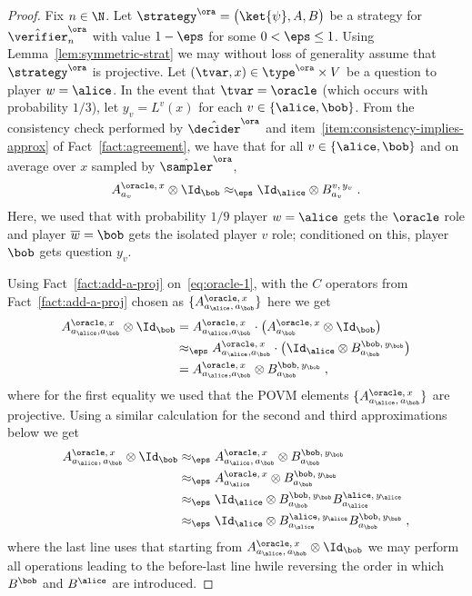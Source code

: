 \begin{proof}
	Fix $n \in \N$.
  Let $\strategy^\ora = \bigl( \ket{\psi}, A, B \bigr)$ be a strategy
  for $\tvora_n$ with value $1 - \eps$ for some $0 < \eps \leq 1$. Using Lemma~\ref{lem:symmetric-strat} we may without loss of generality assume that $\strategy^\ora$ is projective. 
  Let $(\tvar,x) \in \type^\ora \times V$ be a question to player $w=\alice$.
  In the event that $\tvar = \oracle$ (which occurs with probability $1/3$), let
  $y_v = L^v(x)$ for each $v \in \{\alice,\bob\}$.
  From the consistency check performed by $\tdora$ and
  item~\ref{item:consistency-implies-approx} of Fact~\ref{fact:agreement}, we
  have that for all $v \in \{\alice,\bob\}$ and on average over $x$ sampled by
  $\tsora$,
  \begin{equation}
    \label{eq:oracle-1}
    A^{\oracle,\, x}_{a_v} \otimes \Id_\bob  \approx_\eps
    \Id_\alice \otimes B^{v,\, y_v}_{a_v}\;.
  \end{equation}     
  Here, we used that with probability $1/9$ player $w=\alice$ gets the $\oracle$
  role and player $\overline{w}=\bob$ gets the isolated player $v$ role;
  conditioned on this, player $\bob$ gets question $y_v$.
	
	Using 
	Fact~\ref{fact:add-a-proj} on~\eqref{eq:oracle-1}, with the $C$ operators from  Fact~\ref{fact:add-a-proj} chosen as $\{A^{\oracle,\, x}_{a_\alice,\,
    a_\bob}\}$ here we get
		  \begin{align}
   A^{\oracle,\, x}_{a_\alice,a_\bob} \otimes \Id_\bob  &=  A^{\oracle,\, x}_{a_\alice,a_\bob} \cdot\big( A^{\oracle,\, x}_{a_\bob} \otimes \Id_\bob \big) \notag\\
	&\approx_\eps
   A^{\oracle,\, x}_{a_\alice,a_\bob}\cdot\big( \Id_\alice \otimes B^{\bob,\, y_\bob}_{a_\bob}\big) \notag\\
	&= A^{\oracle,\, x}_{a_\alice,a_\bob}\otimes B^{\bob,\, y_\bob}_{a_\bob}\;,   \label{eq:oracle-1b}
  \end{align}   
		where for the first equality we used that the POVM elements $\{A^{\oracle,\, x}_{a_\alice,\,
    a_\bob}\}$ are projective. Using a similar calculation for the second and third approximations below we get
  \begin{equation}
    \label{eq:oracle-2}
    \begin{split}
      A^{\oracle,\, x}_{a_\alice,\, a_\bob} \otimes \Id_\bob
      & \approx_{\eps} A^{\oracle,\, x}_{a_\alice,\, a_\bob}  \otimes
      B^{\bob,\, y_\bob}_{a_\bob} \\
      &\approx_{\eps} A^{\oracle,\, x}_{a_\alice} \otimes
      B^{\bob,\, y_\bob}_{a_\bob} \\
      & \approx_\eps \Id_\alice \otimes
      B^{\bob,\, y_\bob}_{a_\bob} B^{\alice,\, y_\alice}_{a_\alice} \\
      & \approx_\eps \Id_\alice \otimes
      B^{\alice,\, y_\alice}_{a_\alice} B^{\bob,\, y_\bob}_{a_\bob}\;,
    \end{split}
  \end{equation}
	where the last line uses that starting from $A^{\oracle,\, x}_{a_\alice,\, a_\bob} \otimes \Id_\bob$ we may perform all operations leading to the before-last line hwile reversing the order in which $B^\bob$ and $B^\alice$ are introduced. 
	

\end{proof}

